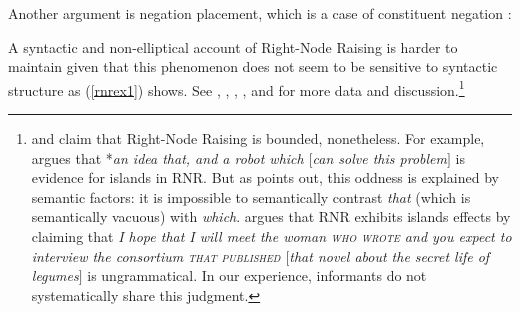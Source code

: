 \documentclass[output=paper
                ,modfonts
                ,nonflat
	        ,collection
	        ,collectionchapter
	        ,collectiontoclongg
 	        ,biblatex
                ,babelshorthands
                ,newtxmath
                ,draftmode
                ,colorlinks, citecolor=brown
]{./langsci/langscibook}
\begin{document}
\begin{exe}
\ex 
\begin{xlista}


\end{xlista}
\end{exe}

\noindent
Another argument is negation placement, which is a case of constituent negation
\citep[253]{Mouret:06}: 

\begin{exe}
 \ex 
 \begin{xlista}
\end{xlista}
\end{exe}


A syntactic and non-elliptical account of Right-Node Raising is harder to maintain given that this phenomenon does not seem to be sensitive to  syntactic structure as (\ref{rnrex1}) shows. See 
\citet{bresnan74},
 \citet[299]{wexlercull},  \citet[45]{grosu81},
 \citet{
mccawley},  and \citet[382, footnote 30]{sab}
for more data and discussion.\footnote{\citet{
steedman85,gapsteed,steedmanbook}
and \citet[183]{dowty88} claim that
Right-Node Raising is bounded, nonetheless.
For example, \citet{
dowty88} argues that  *\emph{an idea that, and a robot which $[$can solve this problem$]$} is  evidence for islands in RNR. But as \citet[95]{phil}
 points out, this oddness is explained by semantic factors: it is impossible to   semantically contrast \emph{that} (which is semantically vacuous) with \emph{which}.
 \citet[17]{steedmanbook}   argues that RNR
exhibits islands effects by claiming that \emph{I hope that I will meet the woman
\textsc{who wrote} and you expect to interview the
consortium \textsc{that published} $[$that
novel about the secret life of legumes$]$} is ungrammatical.
In our experience, informants do not systematically share this judgment.}
\end{document}
